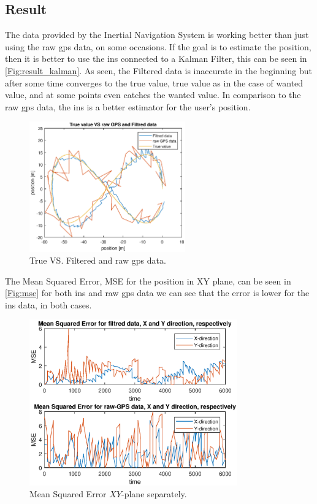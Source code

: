 \subsection{Result}
The data provided by the Inertial Navigation System is working better than just using the raw \gls{gps} data, on some occasions. If the goal is to estimate the position, then it is better to use the \gls{ins} connected to a Kalman Filter, this can be seen in \autoref{Fig:result_kalman}. As seen, the Filtered data is inaccurate in the beginning but after some time converges to the true value, true value as in the case of wanted value, and at some points even catches the wanted value. In comparison to the raw \gls{gps} data, the \gls{ins} is a better estimator for the user's position.
\begin{figure}[H]
\centering
\includegraphics[width=0.6\textwidth]{result.eps}
\caption{True VS. Filtered and raw \gls{gps} data.}
\label{Fig:result_kalman}
\end{figure}

The Mean Squared Error, MSE for the position in XY plane, can be seen in \autoref{Fig:mse} for both \gls{ins} and raw \gls{gps} data we can see that the error is lower for the \gls{ins} data, in both cases. 
\begin{figure}[H]
\centering
\includegraphics[width=0.8\textwidth]{mse.eps}
\caption{Mean Squared Error $XY$-plane separately.}
\label{Fig:mse}
\end{figure}

